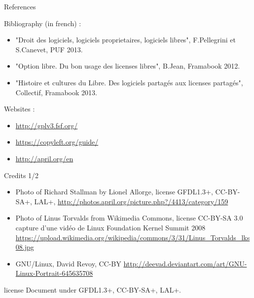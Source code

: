 \documentclass{beamer}
\begin{document}
\begin{frame}{References}

  Bibliography (in french) :

  \begin{itemize}
  \item "Droit des logiciels, logiciels proprietaires, logiciels
    libres", F.Pellegrini et S.Canevet, PUF 2013.
  \item "Option libre. Du bon usage des licenses libres", B.Jean,
    Framabook 2012.
  \item "Histoire et cultures du Libre. Des logiciels partagés aux
    licenses partagés", Collectif, Framabook 2013.
  \end{itemize}

  Websites :

  \begin{itemize}
  \item \url{http://gplv3.fsf.org/}
  \item \url{https://copyleft.org/guide/}
  \item \url{http://april.org/en}
  \end{itemize}
  
\end{frame}

\begin{frame}{Credits 1/2}
  \begin{itemize}
  \item Photo of Richard Stallman by Lionel Allorge, license GFDL1.3+,
    CC-BY-SA+, LAL+,
    \url{http://photos.april.org/picture.php?/4413/category/159}
  \item Photo of Linus Torvalds from Wikimedia Commons, license
    CC-BY-SA 3.0 capture d'une vidéo de Linux Foundation Kernel Summit
    2008
    \url{https://upload.wikimedia.org/wikipedia/commons/3/31/Linus_Torvalds_lks08.jpg}
  \item GNU/Linux, David Revoy, CC-BY
    \url{http://deevad.deviantart.com/art/GNU-Linux-Portrait-645635708}
  
  \end{itemize}
\end{frame}

\begin{frame}{license}
  Document under GFDL1.3+, CC-BY-SA+, LAL+.
\end{frame}
\end{document}
